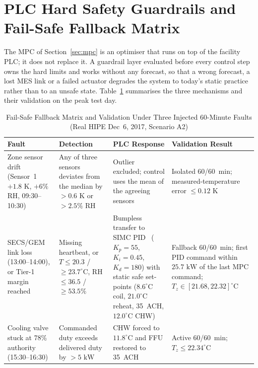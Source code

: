 \section{PLC Hard Safety Guardrails and Fail-Safe Fallback Matrix}
\label{sec:plc}

The MPC of Section~\ref{sec:mpc} is an optimiser that runs on top of the facility PLC; it does not replace it. A guardrail layer evaluated before every control step owns the hard limits and works without any forecast, so that a wrong forecast, a lost MES link or a failed actuator degrades the system to today's static practice rather than to an unsafe state. Table~\ref{tab:fallback} summarises the three mechanisms and their validation on the peak test day.

\begin{table}[htbp]
\centering
\caption{Fail-Safe Fallback Matrix and Validation Under Three Injected 60-Minute Faults (Real HIPE Dec~6, 2017, Scenario A2)}
\label{tab:fallback}
\small
\renewcommand{\arraystretch}{1.12}
\begin{tabular}{@{}>{\raggedright\arraybackslash}p{2.7cm}>{\raggedright\arraybackslash}p{3.6cm}>{\raggedright\arraybackslash}p{4.3cm}>{\raggedright\arraybackslash}p{3.9cm}@{}}
\toprule
\textbf{Fault} & \textbf{Detection} & \textbf{PLC Response} & \textbf{Validation Result} \\
\midrule
Zone sensor drift (Sensor~1 $+1.8\text{ K}$, $+6\%$ RH, 09:30--10:30) &
Any of three sensors deviates from the median by $>0.6\text{ K}$ or $>2.5\%$ RH &
Outlier excluded; control uses the mean of the agreeing sensors &
Isolated 60/60~min; measured-temperature error $\le 0.12\text{ K}$ \\
\addlinespace
SECS/GEM link loss (13:00--14:00), or Tier-1 margin reached &
Missing heartbeat, or $T \le 20.3$ / $\ge 23.7^\circ\text{C}$, RH $\le 36.5$ / $\ge 53.5\%$ &
Bumpless transfer to SIMC PID~\cite{skogestad2003} ($K_p = 55$, $K_i = 0.45$, $K_d = 180$) with static safe set-points ($8.6^\circ\text{C}$ coil, $21.0^\circ\text{C}$ reheat, 35~ACH, $12.0^\circ\text{C}$ CHW) &
Fallback 60/60~min; first PID command within $25.7\text{ kW}$ of the last MPC command; $T_z \in [21.68, 22.32]^\circ\text{C}$ \\
\addlinespace
Cooling valve stuck at 78\% authority (15:30--16:30) &
Commanded duty exceeds delivered duty by $>5\text{ kW}$ &
CHW forced to $11.8^\circ\text{C}$ and FFU restored to 35~ACH &
Active 60/60~min; $T_z \le 22.34^\circ\text{C}$ \\
\bottomrule
\end{tabular}
\end{table}

